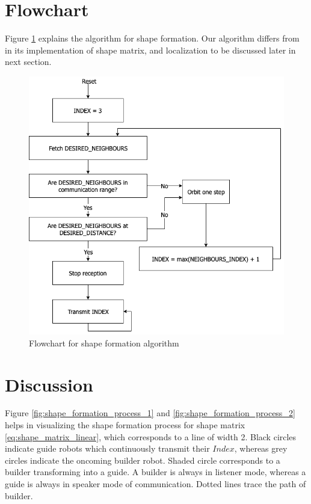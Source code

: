 \documentclass{report}[12pt]
\begin{document}
\section{Flowchart}
Figure \ref{fig:fc_shape_form} explains the algorithm for shape formation. Our algorithm differs from \cite{MR-AC-RN:2014} in its implementation of shape matrix, and localization to be discussed later in next section.
\begin{figure}[H]
    \centering
    \includegraphics[scale=0.6]{images/shape_formation}
    \caption{Flowchart for shape formation algorithm}
    \label{fig:fc_shape_form}
\end{figure}

\section{Discussion}
Figure \ref{fig:shape_formation_process_1} and \ref{fig:shape_formation_process_2} helps in visualizing the shape formation process for shape matrix \eqref{eq:shape_matrix_linear}, which corresponds to a line of width 2. Black circles indicate guide robots which continuously transmit their $Index$, whereas grey circles indicate the oncoming builder robot. Shaded circle corresponds to a builder transforming into a guide. A builder is always in listener mode, whereas a guide is always in speaker mode of communication. Dotted lines trace the path of builder.
\end{document}

